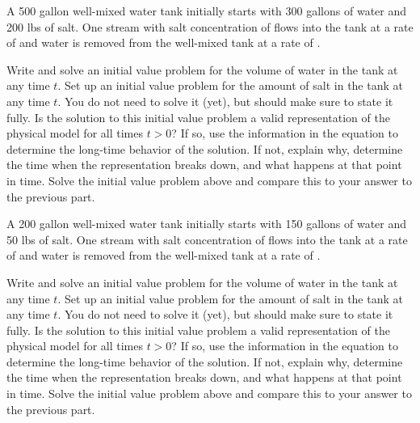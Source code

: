\documentclass{ximera}
\begin{document}
\begin{exercise}
    A 500 gallon well-mixed water tank initially starts with 300 gallons of water and 200 lbs of salt. One stream with salt concentration of  flows into the tank at a rate of  and water is removed from the well-mixed tank at a rate of .
    \begin{tasks}
        \task Write and solve an initial value problem for the volume of water in the tank at any time $t$.
        \task Set up an initial value problem for the amount of salt in the tank at any time $t$. You do not need to solve it (yet), but should make sure to state it fully.
        \task Is the solution to this initial value problem a valid representation of the physical model for all times $t > 0$? If so, use the information in the equation to determine the long-time behavior of the solution. If not, explain why, determine the time when the representation breaks down, and what happens at that point in time.
        \task Solve the initial value problem above and compare this to your answer to the previous part.
    \end{tasks}
\end{exercise}

\begin{exercise}
    A 200 gallon well-mixed water tank initially starts with 150 gallons of water and 50 lbs of salt. One stream with salt concentration of  flows into the tank at a rate of  and water is removed from the well-mixed tank at a rate of .
    \begin{tasks}
        \task Write and solve an initial value problem for the volume of water in the tank at any time $t$.
        \task Set up an initial value problem for the amount of salt in the tank at any time $t$. You do not need to solve it (yet), but should make sure to state it fully.
        \task Is the solution to this initial value problem a valid representation of the physical model for all times $t > 0$? If so, use the information in the equation to determine the long-time behavior of the solution. If not, explain why, determine the time when the representation breaks down, and what happens at that point in time.
        \task Solve the initial value problem above and compare this to your answer to the previous part.
    \end{tasks}
\end{exercise}
\end{document}
